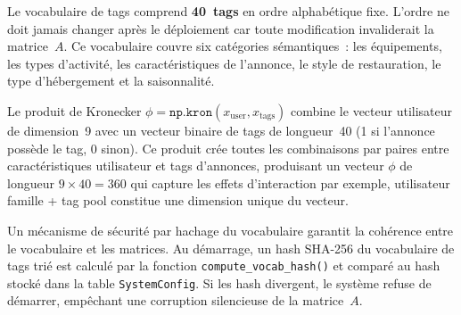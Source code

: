 Le vocabulaire de tags comprend \textbf{40~tags} en ordre alphabétique fixe. L'ordre ne doit
jamais changer après le déploiement car toute modification invaliderait la matrice~$A$. Ce
vocabulaire couvre six catégories sémantiques~: les équipements, les types d'activité, les
caractéristiques de l'annonce, le style de restauration, le type d'hébergement et la
saisonnalité.

Le produit de Kronecker $\phi = \texttt{np.kron}(x_{\text{user}}, x_{\text{tags}})$ combine
le vecteur utilisateur de dimension~9 avec un vecteur binaire de tags de longueur~40 (1 si
l'annonce possède le tag, 0 sinon). Ce produit crée toutes les combinaisons par paires entre
caractéristiques utilisateur et tags d'annonces, produisant un vecteur $\phi$ de longueur
$9 \times 40 = 360$ qui capture les effets d'interaction   par exemple, \og{}utilisateur
famille + tag pool\fg{} constitue une dimension unique du vecteur.

Un mécanisme de sécurité par hachage du vocabulaire garantit la cohérence entre le vocabulaire
et les matrices. Au démarrage, un hash SHA-256 du vocabulaire de tags trié est calculé par la
fonction \texttt{compute\_vocab\_hash()} et comparé au hash stocké dans la table
\texttt{SystemConfig}. Si les hash divergent, le système refuse de démarrer, empêchant une
corruption silencieuse de la matrice~$A$.

